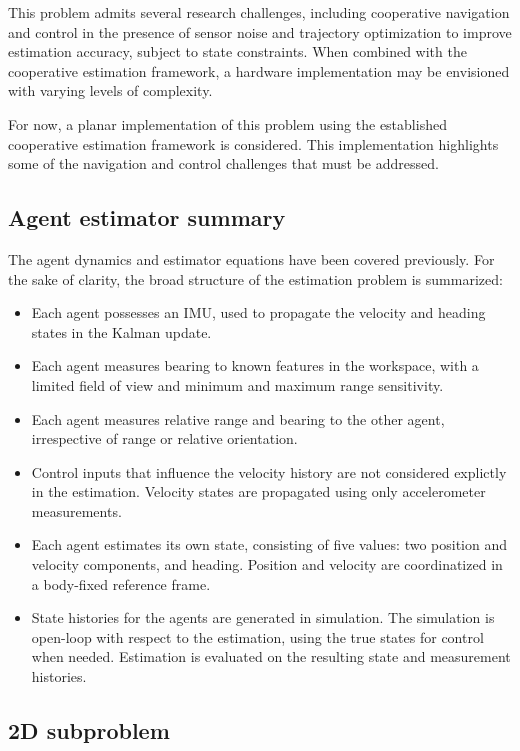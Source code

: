 \documentclass{aiaa-tc}
\begin{document}
This problem admits several research challenges, including cooperative navigation and control in the presence of sensor noise and trajectory optimization to improve estimation accuracy, subject to state constraints. When combined with the cooperative estimation framework, a hardware implementation may be envisioned with varying levels of complexity.

For now, a planar implementation of this problem using the established cooperative estimation framework is considered. This implementation highlights some of the navigation and control challenges that must be addressed.

\subsection{Agent estimator summary}

The agent dynamics and estimator equations have been covered previously. For the sake of clarity, the broad structure of the estimation problem is summarized:

\begin{itemize}
\item Each agent possesses an IMU, used to propagate the velocity and heading states in the Kalman update.
\item Each agent measures bearing to known features in the workspace, with a limited field of view and minimum and maximum range sensitivity.
\item Each agent measures relative range and bearing to the other agent, irrespective of range or relative orientation.
\item Control inputs that influence the velocity history are not considered explictly in the estimation. Velocity states are propagated using only accelerometer measurements.
\item Each agent estimates its own state, consisting of five values: two position and velocity components, and heading. Position and velocity are coordinatized in a body-fixed reference frame.
\item State histories for the agents are generated in simulation. The simulation is open-loop with respect to the estimation, using the true states for control when needed. Estimation is evaluated on the resulting state and measurement histories.
\end{itemize}

\subsection{2D subproblem}
\end{document}
